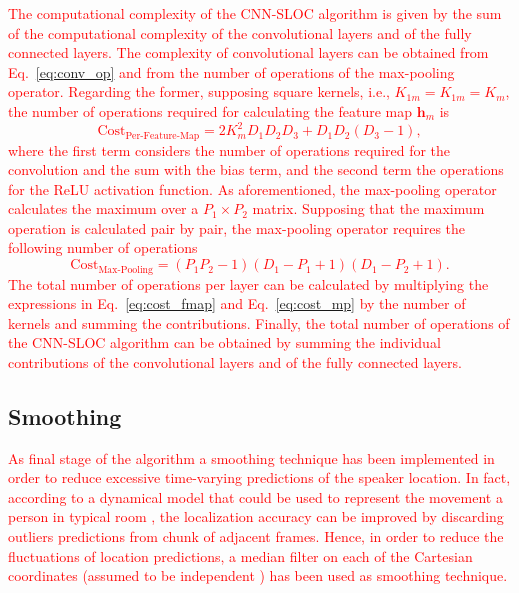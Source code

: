 \documentclass[review]{elsarticle}
\let\originaleqref=\eqref
\renewcommand{\eqref}{Eq.~\originaleqref}
\begin{document}
\textcolor{red}{The computational complexity of the CNN-SLOC algorithm is given by the sum of the computational complexity of the convolutional layers and of the fully connected layers. The complexity of convolutional layers can be obtained from \eqref{eq:conv_op} and from the number of operations of the max-pooling operator. Regarding the former, supposing square kernels, i.e., $K_{1m} = K_{1m} = K_m$, the number of operations required for calculating the feature map $\mathbf{h}_{m}$ is
\begin{equation}\label{eq:cost_fmap}
\text{Cost}_{\text{Per-Feature-Map}} =2K_m^2D_1D_2D_3+D_1D_2(D_3-1),
\end{equation}
where the first term considers the number of operations required for the convolution and the sum with the bias term, and the second term the operations for the ReLU activation function. As aforementioned, the max-pooling operator calculates the maximum over a $P_1 \times P_2 $ matrix. Supposing that the maximum operation is calculated pair by pair, the max-pooling operator requires the following number of operations
\begin{equation}\label{eq:cost_mp}
\text{Cost}_{\text{Max-Pooling}}=(P_1P_2-1)(D_1-P_1+1)(D_1-P_2+1).
\end{equation}
The total number of operations per layer can be calculated by multiplying the expressions in \eqref{eq:cost_fmap} and \eqref{eq:cost_mp} by the number of kernels and summing the contributions. Finally, the total number of operations of the CNN-SLOC algorithm can be obtained by summing the individual contributions of the convolutional layers and of the fully connected layers.}

\subsection{Smoothing}
\textcolor{red}{
As final stage of the algorithm a smoothing technique has been implemented in order to reduce excessive time-varying predictions of the speaker location. In fact, according to a dynamical model that could be used to represent the movement a person in typical room \cite{vermaak2001nonlinear}, the localization accuracy can be improved by discarding outliers predictions from chunk of adjacent frames. 
}
\textcolor{red}{
Hence, in order to reduce the fluctuations of location predictions, a median filter on each of the Cartesian coordinates (assumed to be independent \cite{vermaak2001nonlinear}) has been used as smoothing technique. %
}
\end{document}
